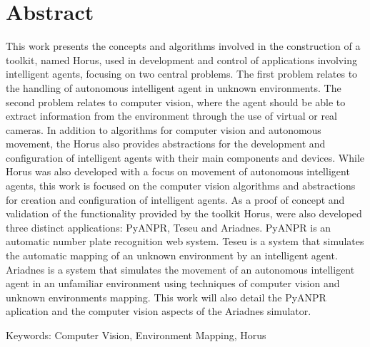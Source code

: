 

\chapter*{Abstract}
This work presents the concepts and algorithms involved in the construction of a toolkit, named Horus, used in development and control of applications involving intelligent agents, focusing on two central problems. The first problem relates to the handling of autonomous intelligent agent in unknown environments. The second problem relates to computer vision, where the agent should be able to extract information from the environment through the use of virtual or real cameras. In addition to algorithms for computer vision and autonomous movement, the Horus also provides abstractions for the development and configuration of intelligent agents with their main components and devices. While Horus was also developed with a focus on movement of autonomous intelligent agents, this work is focused on the computer vision algorithms and abstractions for creation and configuration of intelligent agents. As a proof of concept and validation of the functionality provided by the toolkit Horus, were also developed three distinct applications: PyANPR, Teseu and Ariadnes. PyANPR is an automatic number plate recognition web system. Teseu is a system that simulates the automatic mapping of an unknown environment by an intelligent agent. Ariadnes is a system that simulates the movement of an autonomous intelligent agent in an unfamiliar environment using techniques of computer vision and unknown environments mapping. This work will also detail the PyANPR aplication and the computer vision aspects of the Ariadnes simulator.


\vspace{0.5cm}

Keywords: Computer Vision, Environment Mapping, Horus

